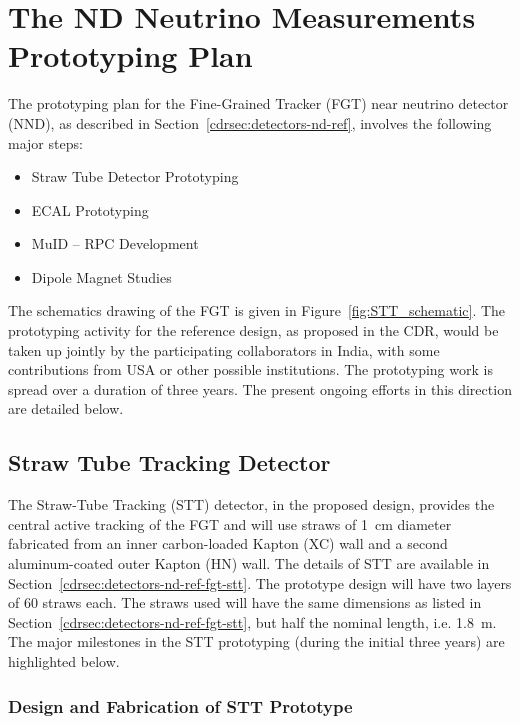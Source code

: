 
\section{The ND Neutrino Measurements Prototyping Plan} 
\label{sec:proto-nd-nnd}


The prototyping plan for the Fine-Grained Tracker (FGT) near neutrino
detector (NND), as described in Section~\ref{cdrsec:detectors-nd-ref},
involves the following major steps:
\begin{itemize} 
\item Straw Tube Detector Prototyping
\item ECAL Prototyping
\item MuID -- RPC Development 
\item Dipole Magnet Studies
\end{itemize} 

The schematics drawing of the FGT is given in
Figure~\ref{fig:STT_schematic}. The prototyping activity for the
reference design, as proposed in the CDR, would be taken up jointly by
the participating collaborators in India, with some contributions from
USA or other possible institutions.  The prototyping work is spread
over a duration of three years. The present ongoing efforts in this
direction are detailed below.

\subsection{Straw Tube Tracking Detector} 

The Straw-Tube Tracking (STT) detector, in the proposed design,
provides the central active tracking of the FGT and will use straws of
1~cm diameter fabricated from an inner carbon-loaded Kapton (XC) wall
and a second aluminum-coated outer Kapton (HN) wall. The details of
STT are available in
Section~\ref{cdrsec:detectors-nd-ref-fgt-stt}. The prototype design
will have two layers of 60 straws each.  The straws used will have the
same dimensions as listed in
Section~\ref{cdrsec:detectors-nd-ref-fgt-stt}, but half the nominal
length, i.e. 1.8~m. The major milestones in the STT prototyping
(during the initial three years) are highlighted below.

\subsubsection{Design and Fabrication of STT Prototype} 

